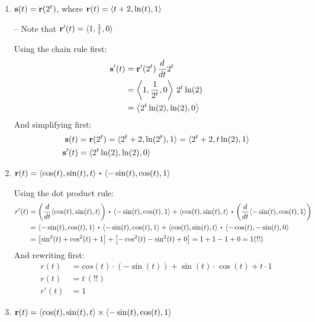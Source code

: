 \begin{enumerate}[leftmargin=0pt]
\begin{enumerate}
    \item $\mathbf{s}(t) = \mathbf{r}(2^t)$, where $\mathbf{r}(t) = \langle t+2, \ln(t), 1 \rangle$ \begin{red}
        -- Note that $\mathbf{r}'(t) = \langle 1, \frac1t, 0 \rangle$
    \end{red}
    
    \begin{red}
        Using the chain rule first:
        \begin{align*}
            \mathbf{s}'(t) &= \mathbf{r}'(2^t)\, \frac{d}{dt}2^t \\
            &=\left\langle 1, \dfrac{1}{2^t}, 0\right\rangle
            \, 2^t \ln(2) \\
            &= \left\langle 2^t \ln(2), \ln(2), 0 \right\rangle
        \end{align*}
        And simplifying first:
        \begin{align*}
            \mathbf{s}(t) &= \mathbf{r}(2^t) = \langle 2^t + 2, \ln(2^t), 1\rangle 
            = \langle 2^t + 2, t\ln(2), 1\rangle \\
            \mathbf{s}'(t) &= \langle 2^t \ln(2), \ln(2), 0 \rangle
        \end{align*}
    \end{red}
    \item $\displaystyle \vr(t) = \langle \cos(t), \sin(t), t \rangle \dotp \langle -\sin(t), \cos(t), 1 \rangle$
    
    \begin{red}
        Using the dot product rule:
        \begin{align*}
            r'(t) &= \left(\frac{d}{dt}\langle \cos(t), \sin(t), t \rangle \right)\dotp \langle -\sin(t), \cos(t), 1 \rangle
            + \langle \cos(t), \sin(t), t \rangle \dotp \left(\frac{d}{dt} \langle -\sin(t), \cos(t), 1 \rangle\right) \\
            &= \langle -\sin(t), \cos(t), 1 \rangle \dotp \langle -\sin(t), \cos(t), 1 \rangle 
            + \langle \cos(t), \sin(t), t \rangle \dotp \langle -\cos(t), -\sin(t), 0\rangle \\
            &= \left[ \sin^2(t) + \cos^2(t) + 1 \right]
            + \left[ -\cos^2(t) -\sin^2(t) + 0\right] = 1 + 1 - 1 + 0 = 1 (!!)
        \end{align*}
        And rewriting first:
        \begin{align*}
            r(t) &= cos(t)\cdot(-\sin(t)) + \sin(t)\cdot\cos(t) + t\cdot 1 \\
            r(t) &= t \, (!!) \\
            r'(t) &= 1
        \end{align*}
    \end{red}
    \item $\displaystyle \mathbf{r}(t) = \langle \cos(t), \sin(t), t \rangle \times \langle -\sin(t), \cos(t), 1 \rangle$
    

\end{enumerate}
\end{enumerate}

